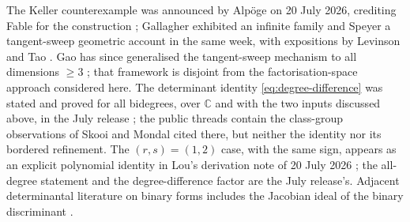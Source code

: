 \documentclass[11pt,reqno]{amsart}
\theoremstyle{definition}
\theoremstyle{remark}
\newcommand{\C}{\mathbb C}
\begin{document}
The Keller counterexample was announced by Alp\"oge on 20 July 2026,
crediting Fable for the construction
\cite{AlpogeAnnouncement,AnonymousCounterexample}; Gallagher exhibited
an infinite family and Speyer a tangent-sweep geometric account in the
same week, with expositions by Levinson and Tao
\cite{SpeyerThread,LevinsonGeometry,TaoDigestion}.  Gao has since
generalised the tangent-sweep mechanism to all dimensions
$\ge3$ \cite{Gao2026}; that framework is disjoint from the
factorisation-space approach considered here.  The determinant
identity \eqref{eq:degree-difference} was stated and proved for all
bidegrees, over $\C$ and with the two inputs discussed above, in the
July release \cite{DDAS}; the public threads contain the class-group
observations of Skooi and Mondal cited there, but neither the
identity nor its bordered refinement.  The
$(r,s)=(1,2)$ case, with the same sign, appears as an explicit
polynomial identity in Lou's derivation note of 20 July 2026
\cite[Lemma~1]{Lou2026}; the all-degree statement and the
degree-difference factor are the July release's.  Adjacent
determinantal literature on binary forms includes the Jacobian ideal
of the binary discriminant \cite{DAndreaChipalkatti2007}.
\end{document}
